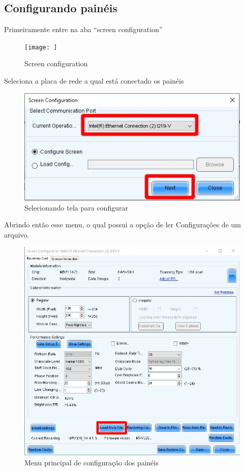 \documentclass[12pt, a4paper]{article}
\begin{document}
\subsection{Configurando painéis}\label{Configurando painéis}
Primeiramente entre na aba ``screen configuration''
\begin{figure}[!htb]
	\centering
	\texttt{[image: ]}
	\caption{\label{fig:}Screen configuration}
\end{figure}

Seleciona a placa de rede a qual está conectado os painéis
\begin{figure}[!htb]
	\centering
	\includegraphics[width=\textwidth]{SC0.jpeg}
	\caption{\label{fig:SC0.jpeg}Selecionando tela para configurar}
\end{figure}

\newpage
Abrindo então esse menu, o qual possui a opção de ler Configurações de um arquivo.
\begin{figure}[!htb]
	\centering
	\includegraphics[width=\textwidth]{SC1.jpeg}
	\caption{\label{fig:SC1.jpeg}Menu principal de configuração dos painéis}
\end{figure}
\end{document}
